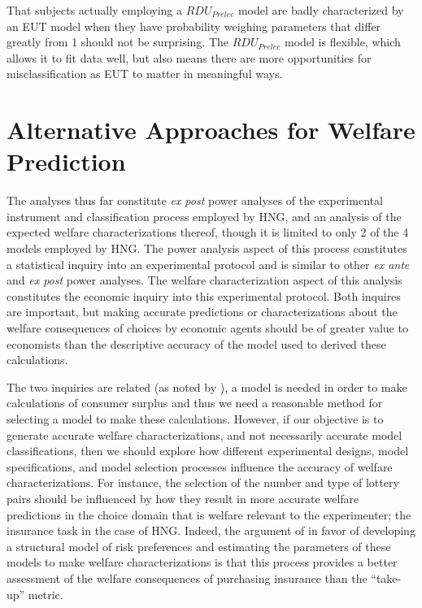 \documentclass[../main.tex]{subfiles}
\begin{document}
That subjects actually employing a $\mathit{RDU_{Prelec}}$ model are badly characterized by an EUT model when they have probability weighing parameters that differ greatly from 1 should not be surprising.
The $\mathit{RDU_{Prelec}}$ model is flexible, which allows it to fit data well, but also means there are more opportunities for misclassification as EUT to matter in meaningful ways.

\section{Alternative Approaches for Welfare Prediction}

The analyses thus far constitute \textit{ex post} power analyses of the experimental instrument and classification process employed by HNG, and an analysis of the expected welfare characterizations thereof, though it is limited to only 2 of the 4 models employed by HNG.
The power analysis aspect of this process constitutes a statistical inquiry into an experimental protocol and is similar to other \textit{ex ante} and \textit{ex post} power analyses.
The welfare characterization aspect of this analysis constitutes the economic inquiry into this experimental protocol.
Both inquires are important, but making accurate predictions or characterizations about the welfare consequences of choices by economic agents should be of greater value to economists than the descriptive accuracy of the model used to derived these calculations.{\footnotemark}

\addtocounter{footnote}{-1}

The two inquiries are related (as noted by \textcite[105]{Harrison2016}), a model is needed in order to make calculations of consumer surplus and thus we need a reasonable method for selecting a model to make these calculations.
However, if our objective is to generate accurate welfare characterizations, and not necessarily accurate model classifications, then we should explore how different experimental designs, model specifications, and model selection processes influence the accuracy of welfare characterizations.
For instance, the selection of the number and type of lottery pairs should be influenced by how they result in more accurate welfare predictions in the choice domain that is welfare relevant to the experimenter; the insurance task in the case of HNG.
Indeed, the argument of \textcite{Harrison2016} in favor of developing a structural model of risk preferences and estimating the parameters of these models to make welfare characterizations is that this process provides a better assessment of the welfare consequences of purchasing insurance than the \enquote{take-up} metric.{\footnotemark}
\end{document}
